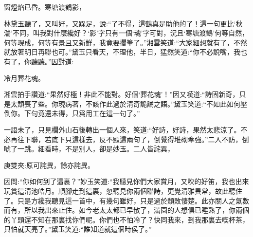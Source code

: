 \begin{poem}
    \begin{pl}窗燈焰已昏。寒塘渡鶴影，\end{pl}
\end{poem}


\begin{parag}
    林黛玉聽了，又叫好，又跺足，說:“了不得，這鶴真是助他的了！這一句更比‘秋湍’不同，叫我對什麼纔好？‘影’字只有一個‘魂’字可對，況且‘寒塘渡鶴’何等自然，何等現成，何等有景且又新鮮，我竟要擱筆了。”湘雲笑道:“大家細想就有了，不然就放著明日再聯也可。”黛玉只看天，不理他，半日，猛然笑道:“你不必說嘴，我也有了，你聽聽。”因對道:
\end{parag}


\begin{poem}
    \begin{pl}冷月葬花魂。\end{pl}
\end{poem}


\begin{parag}
    湘雲拍手讚道:“果然好極！非此不能對。好個‘葬花魂’！”因又嘆道:“詩固新奇，只是太頹喪了些。你現病著，不該作此過於清奇詭譎之語。”黛玉笑道:“不如此如何壓倒你。下句竟還未得，只爲用工在這一句了。”
\end{parag}


\begin{parag}
    一語未了，只見欄外山石後轉出一個人來，笑道:“好詩，好詩，果然太悲涼了。不必再往下聯，若底下只這樣去，反不顯這兩句了，倒覺得堆砌牽強。”二人不防，倒唬了一跳。細看時，不是別人，卻是妙玉。二人皆詫異，\begin{note}庚雙夾:原可詫異，餘亦詫異。\end{note}因問:“你如何到了這裏？”妙玉笑道:“我聽見你們大家賞月，又吹的好笛，我也出來玩賞這清池皓月。順腳走到這裏，忽聽見你兩個聯詩，更覺清雅異常，故此聽住了。只是方纔我聽見這一首中，有幾句雖好，只是過於頹敗悽楚。此亦關人之氣數而有，所以我出來止住。如今老太太都已早散了，滿園的人想俱已睡熟了，你兩個的丫頭還不知在那裏找你們呢。你們也不怕冷了？快同我來，到我那裏去喫杯茶，只怕就天亮了。”黛玉笑道:“誰知道就這個時侯了。”
\end{parag}


